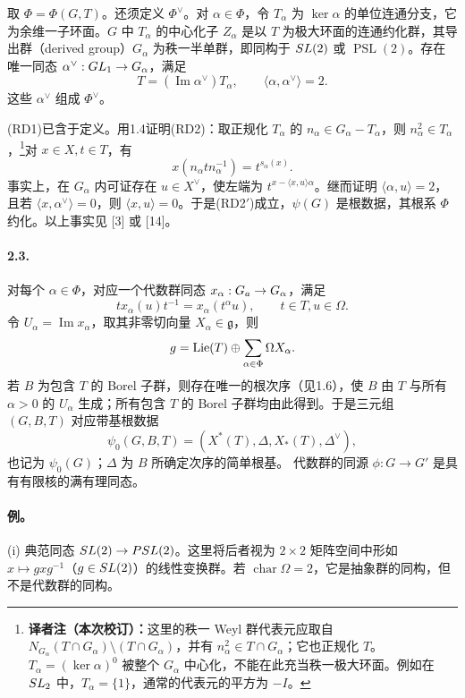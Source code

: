 取 $\Phi=\Phi(G,T)$。还须定义 $\Phi^\vee$。对 $\alpha\in\Phi$，令 $T_\alpha$ 为 $\ker\alpha$ 的单位连通分支，它为余维一子环面。$G$ 中 $T_\alpha$ 的中心化子 $Z_\alpha$ 是以 $T$ 为极大环面的连通约化群，其导出群（derived group）$G_\alpha$ 为秩一半单群，即同构于 $SL(2)$ 或 $\operatorname{PSL}(2)$。存在唯一同态 $\alpha^\vee:GL_1\to G_\alpha$，满足
\[
 T=(\operatorname{Im}\alpha^\vee)T_\alpha,\qquad\langle\alpha,\alpha^\vee\rangle=2.
\]
这些 $\alpha^\vee$ 组成 $\Phi^\vee$。

(RD1)已含于定义。用1.4证明(RD2)：取正规化 $T_\alpha$ 的 $n_\alpha\in G_\alpha-T_\alpha$，则 $n_\alpha^2\in T_\alpha$，\footnote{\textbf{译者注（本次校订）：}这里的秩一 Weyl 群代表元应取自 $N_{G_\alpha}(T\cap G_\alpha)\setminus(T\cap G_\alpha)$，并有 $n_\alpha^2\in T\cap G_\alpha$；它也正规化 $T$。$T_\alpha=(\ker\alpha)^0$ 被整个 $G_\alpha$ 中心化，不能在此充当秩一极大环面。例如在 $SL_2$ 中，$T_\alpha=\{1\}$，通常的代表元的平方为 $-I$。}对 $x\in X,t\in T$，有
\[
 x(n_\alpha tn_\alpha^{-1})=t^{s_\alpha(x)}.
\]
事实上，在 $G_\alpha$ 内可证存在 $u\in X^\vee$，使左端为 $t^{x-\langle x,u\rangle\alpha}$。继而证明 $\langle\alpha,u\rangle=2$，且若 $\langle x,\alpha^\vee\rangle=0$，则 $\langle x,u\rangle=0$。于是(RD2$'$)成立，$\psi(G)$ 是根数据，其根系 $\Phi$ 约化。以上事实见 [3] 或 [14]。
\paragraph*{2.3.} 对每个 $\alpha\in\Phi$，对应一个代数群同态 $x_\alpha:G_{a}\to G_\alpha$，满足
\[
 tx_\alpha(u)t^{-1}=x_\alpha(t^\alpha u),\qquad t\in T,u\in\Omega.
\]
令 $U_\alpha=\operatorname{Im}x_\alpha$，取其非零切向量 $X_\alpha\in\mathfrak g$，则
\[
 \mathfrak g=\Lie(T)\oplus\sum_{\alpha\in\Phi}\Omega X_\alpha.
\]
若 $B$ 为包含 $T$ 的 Borel 子群，则存在唯一的根次序（见1.6），使 $B$ 由 $T$ 与所有 $\alpha>0$ 的 $U_\alpha$ 生成；所有包含 $T$ 的 Borel 子群均由此得到。于是三元组 $(G,B,T)$ 对应带基根数据
\[
 \psi_0(G,B,T)=(X^*(T),\Delta,X_*(T),\Delta^\vee),
\]
也记为 $\psi_0(G)$；$\Delta$ 为 $B$ 所确定次序的简单根基。
代数群的同源 $\phi:G\to G'$ 是具有有限核的满有理同态。

\paragraph*{例。} (i) 典范同态 $SL(2)\to PSL(2)$。这里将后者视为 $2\times2$ 矩阵空间中形如 $x\mapsto gxg^{-1}$（$g\in SL(2)$）的线性变换群。若 $\operatorname{char}\Omega=2$，它是抽象群的同构，但不是代数群的同构。


